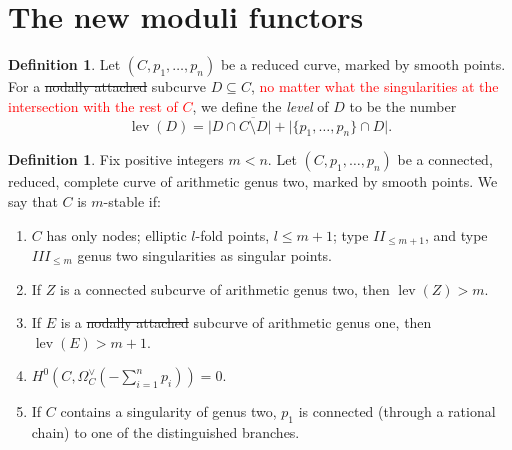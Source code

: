 \documentclass[11pt]{amsart}
\newcommand{\OO}{\mathcal O}
\renewcommand{\to}{\rightarrow}
\newcommand{\dvr}{\Delta}
\newcommand{\lev}{\operatorname{lev}}
\theoremstyle{plain}
\theoremstyle{definition}
\newtheorem{dfn}[thm]{Definition}
\begin{document}

\section{The new moduli functors}
\begin{dfn}
 Let $(C,p_1,\ldots,p_n)$ be a reduced curve, marked by smooth points. For a \sout{nodally attached} subcurve $D\subseteq C$, \textcolor{red}{no matter what the singularities at the intersection with the rest of $C$}, we define the \emph{level} of $D$ to be the number \[ \lev(D)=\lvert D\cap\overline{C\setminus D}\rvert+\lvert\{p_1,\ldots,p_n\}\cap D\rvert.\]
\end{dfn}
\begin{dfn}
 Fix positive integers $m<n$. Let $(C,p_1,\ldots,p_n)$ be a connected, reduced, complete curve of arithmetic genus two, marked by smooth points. We say that $C$ is $m$-stable if:
 \begin{enumerate}
  \item\label{cond:sing} $C$ has only nodes; elliptic $l$-fold points, $l\leq m+1$; type $I\!I_{\leq m+1}$, and type $I\!I\!I_{\leq m}$ genus two singularities as singular points.
  \item\label{cond:lev2} If $Z$ is a connected subcurve of arithmetic genus two, then $\lev(Z)>m$.
  \item\label{cond:lev1} If $E$ is a \sout{nodally attached} subcurve of arithmetic genus one, then $\lev(E)>m+1$.
  \item\label{cond:aut} $H^0(C,\Omega_C^\vee(-\sum_{i=1}^n p_i))=0$.
  \item\label{cond:p1} If $C$ contains a singularity of genus two, $p_1$ is connected (through a rational chain) to one of the distinguished branches.
 \end{enumerate}
\end{dfn}
\end{document}

